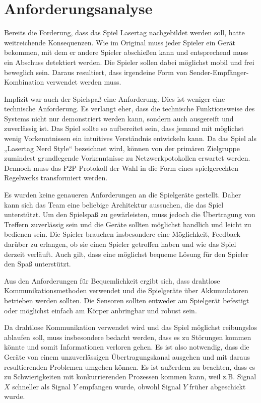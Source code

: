 \section{Anforderungsanalyse}

Bereits die Forderung, dass das Spiel Lasertag nachgebildet werden soll, hatte weitreichende
Konsequenzen.
Wie im Original muss jeder Spieler ein Gerät bekommen, mit dem er andere Spieler abschießen kann und
entsprechend muss ein Abschuss detektiert werden.
Die Spieler sollen dabei möglichst mobil und frei beweglich sein.
Daraus resultiert, dass irgendeine Form von Sender-Empfänger-Kombination verwendet werden muss.

Implizit war auch der Spielspaß eine Anforderung.
Dies ist weniger eine technische Anforderung.
Es verlangt eher, dass die technische Funktionsweise des Systems nicht nur demonstriert werden kann,
sondern auch ausgereift und zuverlässig ist.
Das Spiel sollte so aufbereitet sein, dass jemand mit möglichst wenig Vorkenntnissen ein intuitives
Verständnis entwickeln kann.
Da das Spiel als „Lasertag Nerd Style“ bezeichnet wird, können von der primären Zielgruppe zumindest
grundlegende Vorkenntnisse zu Netzwerkpotokollen erwartet werden. Dennoch muss das P2P-Protokoll der
Wahl in die Form eines spielgerechten Regelwerks transformiert werden.

Es wurden keine genaueren Anforderungen an die Spielgeräte gestellt.
Daher kann sich das Team eine beliebige Architektur aussuchen, die das Spiel unterstützt.
Um den Spielspaß zu gewärleisten, muss jedoch die Übertragung von Treffern zuverlässig sein und die
Geräte sollten möglichst handlich und leicht zu bedienen sein.
Die Spieler brauchen insbesondere eine Möglichkeit, Feedback darüber zu erlangen, ob sie einen
Spieler getroffen haben und wie das Spiel derzeit verläuft. Auch gilt, dass eine möglichst bequeme
Lösung für den Spieler den Spaß unterstützt.

Aus den Anforderungen für Bequemlichkeit ergibt sich, dass drahtlose Kommunikationsmethoden
verwendet und die Spielgeräte über Akkumulatoren betrieben werden sollten.
Die Sensoren sollten entweder am Spielgerät befestigt oder möglichst einfach am Körper anbringbar
und robust sein.

Da drahtlose Kommunikation verwendet wird und das Spiel möglichst reibungslos ablaufen soll, muss
insbesondere bedacht werden, dass es zu Störungen kommen könnte und somit Informationen verloren
gehen.
Es ist also notwendig, dass die Geräte von einem unzuverlässigen Übertragungskanal ausgehen und mit
daraus resultierenden Problemen umgehen können.
Es ist außerdem zu beachten, dass es zu Schwierigkeiten mit konkurrierenden Prozessen kommen kann,
weil z.B. Signal $X$ schneller als Signal $Y$ empfangen wurde, obwohl Signal $Y$ früher abgeschickt
wurde.
